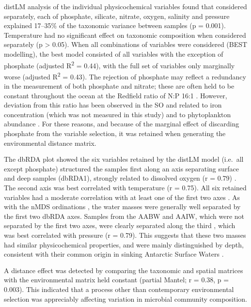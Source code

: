 \ac{distLM} analysis of the individual physicochemical variables found that considered separately, each of phosphate, silicate, nitrate, oxygen, salinity and pressure explained 17--35\% of the taxonomic variance between samples (p = 0.001).
Temperature had no significant effect on taxonomic composition when considered separately (p \textgreater{} 0.05).
When all combinations of variables were considered (BEST modelling), the best model consisted of all variables with the exception of phosphate (adjusted R\textsuperscript{2} = 0.44), with the full set of variables only marginally worse (adjusted R\textsuperscript{2} = 0.43).
The rejection of phosphate may reflect a redundancy in the measurement of both phosphate and nitrate; these are often held to be constant throughout the ocean at the Redfield ratio of N:P \textapprox{}16:1 \cite{Anderson:1994vb}.
However, deviation from this ratio has been observed in the \ac{SO} and related to iron concentration (which was not measured in this study) and to phytoplankton abundance \cite{Weber:2010fi}.
For these reasons, and because of the marginal effect of discarding phosphate from the variable selection, it was retained when generating the environmental distance matrix.

The \ac{dbRDA} plot showed the six variables retained by the \ac{distLM} model (i.e.\ all except phosphate) structured the samples first along an axis separating surface and deep samples (dbRDA1), strongly related to dissolved oxygen (r = 0.79) .
The second axis was best correlated with temperature (r = \textminus{}0.75).
All six retained variables had a moderate correlation with at least one of the first two axes .
As with the \ac{nMDS} ordinations , the water masses were generally well separated by the first two \ac{dbRDA} axes.
Samples from the \ac{AABW} and \ac{AAIW}, which were not separated by the first two axes, were clearly separated along the third , which was best correlated with pressure (r = \textminus{}0.79).
This suggests that these two masses had similar physicochemical properties, and were mainly distinguished by depth, consistent with their common origin in sinking Antarctic Surface Waters \cite{Foldvik:1988gp}.




A distance effect was detected by comparing the taxonomic and spatial matrices with the environmental matrix held constant (partial Mantel; r = 0.38, p = 0.003).
This indicated that a process other than contemporary environmental selection was appreciably affecting variation in microbial community composition.

